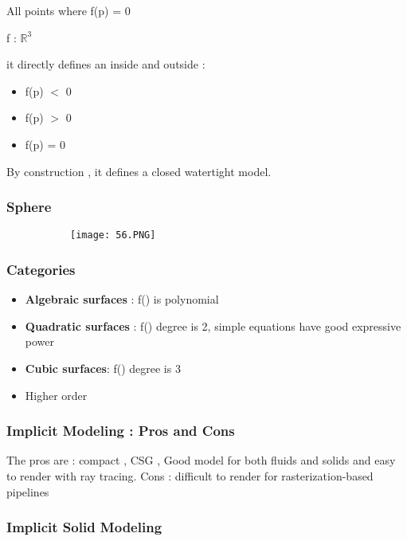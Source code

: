 \documentclass{article}
\begin{document}
All points  where f(p) = 0 

f : $\mathbb{R}^3$ 

it directly defines an inside and outside :
\begin{itemize}
    \item f(p) $<$ 0 
    \item f(p) $>$ 0 
    \item f(p) = 0 
\end{itemize}

By construction , it defines a closed watertight model.

\subsubsection{Sphere}

\begin{figure}[ht!]
  \centering
  \begin{subfigure}[b]{0.4\linewidth}
    \texttt{[image: 56.PNG]}
  \end{subfigure}
\end{figure}


\subsubsection{Categories}

\begin{itemize}
    \item \textbf{Algebraic surfaces} : f() is polynomial
    \item \textbf{Quadratic surfaces} : f() degree is 2, simple equations have good expressive power
    \item \textbf{Cubic surfaces}: f() degree is 3
    \item Higher order
\end{itemize}

\subsubsection{Implicit Modeling : Pros and Cons}

The pros are : compact , CSG , Good model for both fluids and solids and easy to render with ray tracing.
Cons : difficult to render for rasterization-based pipelines

\subsubsection{Implicit Solid Modeling}
\end{document}
